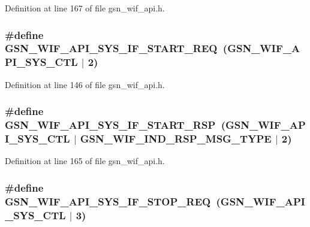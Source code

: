 Definition at line 167 of file gsn\_\-wif\_\-api.h.

\hypertarget{a00606_a1f4b00a872d92b53f729018f11351fdd}{
\subsubsection[{GSN\_\-WIF\_\-API\_\-SYS\_\-IF\_\-START\_\-REQ}]{\setlength{\rightskip}{0pt plus 5cm}\#define GSN\_\-WIF\_\-API\_\-SYS\_\-IF\_\-START\_\-REQ~(GSN\_\-WIF\_\-API\_\-SYS\_\-CTL $|$ 2)}}
\label{a00606_a1f4b00a872d92b53f729018f11351fdd}


Definition at line 146 of file gsn\_\-wif\_\-api.h.

\hypertarget{a00606_a211bdbcd29b041f76e896a89fe48cd33}{
\subsubsection[{GSN\_\-WIF\_\-API\_\-SYS\_\-IF\_\-START\_\-RSP}]{\setlength{\rightskip}{0pt plus 5cm}\#define GSN\_\-WIF\_\-API\_\-SYS\_\-IF\_\-START\_\-RSP~(GSN\_\-WIF\_\-API\_\-SYS\_\-CTL $|$ GSN\_\-WIF\_\-IND\_\-RSP\_\-MSG\_\-TYPE $|$ 2)}}
\label{a00606_a211bdbcd29b041f76e896a89fe48cd33}


Definition at line 165 of file gsn\_\-wif\_\-api.h.

\hypertarget{a00606_ae748e4ad237f8544adc73fd54e198742}{
\subsubsection[{GSN\_\-WIF\_\-API\_\-SYS\_\-IF\_\-STOP\_\-REQ}]{\setlength{\rightskip}{0pt plus 5cm}\#define GSN\_\-WIF\_\-API\_\-SYS\_\-IF\_\-STOP\_\-REQ~(GSN\_\-WIF\_\-API\_\-SYS\_\-CTL $|$ 3)}}
\label{a00606_ae748e4ad237f8544adc73fd54e198742}



